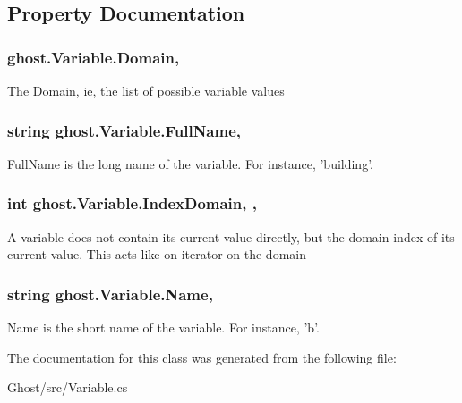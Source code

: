 \subsection{Property Documentation}
\hypertarget{classghost_1_1Variable_aae96e8a30ff2f44dc115a0b51e136e92}{
\subsubsection[{Domain}]{ ghost.\-Variable.\-Domain\hspace{0.3cm}{\ttfamily [get]}, {\ttfamily [set]}}}\label{classghost_1_1Variable_aae96e8a30ff2f44dc115a0b51e136e92}
The \hyperlink{classghost_1_1Domain}{Domain}, ie, the list of possible variable values \hypertarget{classghost_1_1Variable_af20c2f01306cba69f36d32babb703c1d}{
\subsubsection[{Full\-Name}]{\setlength{\rightskip}{0pt plus 5cm}string ghost.\-Variable.\-Full\-Name\hspace{0.3cm}{\ttfamily [get]}, {\ttfamily [set]}}}\label{classghost_1_1Variable_af20c2f01306cba69f36d32babb703c1d}
Full\-Name is the long name of the variable. For instance, 'building'. \hypertarget{classghost_1_1Variable_a4fa08b5d46a4559d345d4752e7a790d2}{
\subsubsection[{Index\-Domain}]{\setlength{\rightskip}{0pt plus 5cm}int ghost.\-Variable.\-Index\-Domain\hspace{0.3cm}{\ttfamily [get]}, {\ttfamily [set]}, {\ttfamily [protected]}}}\label{classghost_1_1Variable_a4fa08b5d46a4559d345d4752e7a790d2}
A variable does not contain its current value directly, but the domain index of its current value. This acts like on iterator on the domain \hypertarget{classghost_1_1Variable_a1dba3848c7675d086eecad078178e4d9}{
\subsubsection[{Name}]{\setlength{\rightskip}{0pt plus 5cm}string ghost.\-Variable.\-Name\hspace{0.3cm}{\ttfamily [get]}, {\ttfamily [set]}}}\label{classghost_1_1Variable_a1dba3848c7675d086eecad078178e4d9}
Name is the short name of the variable. For instance, 'b'. 

The documentation for this class was generated from the following file\-:\begin{DoxyCompactItemize}
\item 
Ghost/src/Variable.\-cs\end{DoxyCompactItemize}
